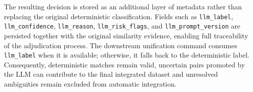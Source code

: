 The resulting decision is stored as an additional layer of metadata rather than replacing the original deterministic classification. Fields such as \texttt{llm\_label}, \texttt{llm\_confidence}, \texttt{llm\_reason}, \texttt{llm\_risk\_flags}, and \texttt{llm\_prompt\_version} are persisted together with the original similarity evidence, enabling full traceability of the adjudication process. The downstream unification command consumes \texttt{llm\_label} when it is available; otherwise, it falls back to the deterministic label. Consequently, deterministic matches remain valid, uncertain pairs promoted by the LLM can contribute to the final integrated dataset and unresolved ambiguities remain excluded from automatic integration.
